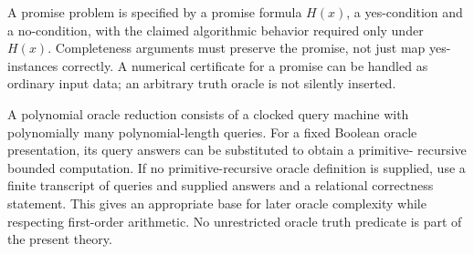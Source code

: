 A promise problem is specified by a promise formula \(H(x)\), a yes-condition
and a no-condition, with the claimed algorithmic behavior required only under
\(H(x)\). Completeness arguments must preserve the promise, not just map
yes-instances correctly. A numerical certificate for a promise can be handled
as ordinary input data; an arbitrary truth oracle is not silently inserted.

A polynomial oracle reduction consists of a clocked query machine with
polynomially many polynomial-length queries. For a fixed Boolean oracle
presentation, its query answers can be substituted to obtain a primitive-
recursive bounded computation. If no primitive-recursive oracle definition
is supplied, use a finite transcript of queries and supplied answers and a
relational correctness statement. This gives an appropriate base for later
oracle complexity while respecting first-order arithmetic. No unrestricted
oracle truth predicate is part of the present theory.
